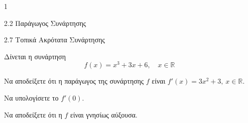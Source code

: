 \begin{ylh}{1}
    \item 2.2 Παράγωγος Συνάρτησης
    \item 2.7 Τοπικά Ακρότατα Συνάρτησης
\end{ylh}
Δίνεται η συνάρτηση
\[ f(x) = x^3 + 3x + 6, \quad x \in \mathbb{R} \]
\begin{alist}
    \item Να αποδείξετε ότι η παράγωγος της συνάρτησης $f$ είναι $f'(x) = 3x^2 + 3, \ x \in \mathbb{R}$.
    \item Να υπολογίσετε το $f'(0)$.
    \item Να αποδείξετε ότι η $f$ είναι γνησίως αύξουσα.
\end{alist}


